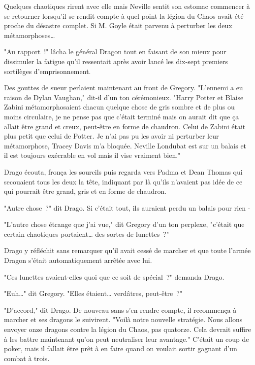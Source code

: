 Quelques chaotiques rirent avec elle mais Neville sentit son estomac commencer à se retourner lorsqu'il se rendit compte à quel point la légion du Chaos avait été proche du désastre complet. Si M. Goyle était parvenu à perturber les deux métamorphoses…

\later

"Au rapport~!" lâcha le général Dragon tout en faisant de son mieux pour dissimuler la fatigue qu'il ressentait après avoir lancé les dix-sept premiers sortilèges d'emprisonnement.

Des gouttes de sueur perlaient maintenant au front de Gregory. "L'ennemi a eu raison de Dylan Vaughan," dit-il d'un ton cérémonieux. "Harry Potter et Blaise Zabini métamorphosaient chacun quelque chose de gris sombre et de plus ou moins circulaire, je ne pense pas que c'était terminé mais on aurait dit que ça allait être grand et creux, peut-être en forme de chaudron. Celui de Zabini était plus petit que celui de Potter. Je n'ai pas pu les avoir ni perturber leur métamorphose, Tracey Davis m'a bloquée. Neville Londubat est sur un balais et il est toujours exécrable en vol mais il vise vraiment bien."

Drago écouta, fronça les sourcils puis regarda vers Padma et Dean Thomas qui secouaient tous les deux la tête, indiquant par là qu'ils n'avaient pas idée de ce qui pourrait être grand, gris et en forme de chaudron.

"Autre chose~?" dit Drago. Si c'était tout, ils auraient perdu un balais pour rien -

"L'autre chose étrange que j'ai vue," dit Gregory d'un ton perplexe, "c'était que certain chaotiques portaient… des sortes de lunettes~?"

Drago y réfléchit sans remarquer qu'il avait cessé de marcher et que toute l'armée Dragon s'était automatiquement arrêtée avec lui.

"Ces lunettes avaient-elles quoi que ce soit de spécial~?" demanda Drago.

"Euh…" dit Gregory. "Elles étaient… verdâtres, peut-être~?"

"D'accord," dit Drago. De nouveau sans s'en rendre compte, il recommença à marcher et ses dragons le suivirent. "Voilà notre nouvelle stratégie. Nous allons envoyer onze dragons contre la légion du Chaos, pas quatorze. Cela devrait suffire à les battre maintenant qu'on peut neutraliser leur avantage." C'était un coup de poker, mais il fallait être prêt à en faire quand on voulait sortir gagnant d'un combat à trois.

